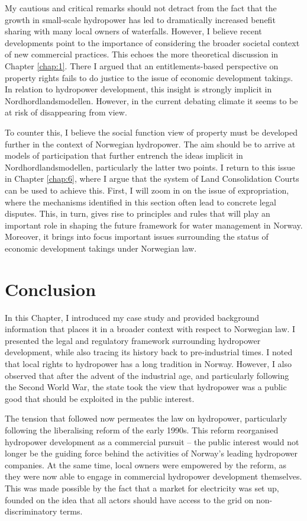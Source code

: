 My cautious and critical remarks should not detract from the fact that the growth in small-scale hydropower has led to dramatically increased benefit sharing with many local owners of waterfalls. However, I believe recent developments point to the importance of considering the broader societal context of new commercial practices. This echoes the more theoretical discussion in Chapter \ref{chap:1}. There I argued that an entitlements-based perspective on property rights fails to do justice to the issue of economic development takings. In relation to hydropower development, this insight is strongly implicit in Nordhordlandsmodellen. However, in the current debating climate it seems to be at risk of disappearing from view.

To counter this, I believe the social function view of property must be developed further in the context of Norwegian hydropower. The aim should be to arrive at models of participation that further entrench the ideas implicit in Nordhordlandsmodellen, particularly the latter two points. I return to this issue in Chapter \ref{chap:6}, where I argue that the system of Land Consolidation Courts can be used to achieve this. First, I will zoom in on the issue of expropriation, where the mechanisms identified in this section often lead to concrete legal disputes. This, in turn, gives rise to principles and rules that will play an important role in shaping the future framework for water management in Norway. Moreover, it brings into focus important issues surrounding the status of economic development takings under Norwegian law.

\section{Conclusion}\label{sec:conc3}

In this Chapter, I introduced my case study and provided background information that places it in a broader context with respect to Norwegian law. I presented the legal and regulatory framework surrounding hydropower development, while also tracing its history back to pre-industrial times. I noted that local rights to hydropower has a long tradition in Norway. However, I also observed that after the advent of the industrial age, and particularly following the Second World War, the state took the view that hydropower was a public good that should be exploited in the public interest.

The tension that followed now permeates the law on hydropower, particularly following the liberalising reform of the early 1990s. This reform reorganised hydropower development as a commercial pursuit -- the public interest would not longer be the guiding force behind the activities of Norway's leading hydropower companies. At the same time, local owners were empowered by the reform, as they were now able to engage in commercial hydropower development themselves. This was made possible by the fact that a market for electricity was set up, founded on the idea that all actors should have access to the grid on non-discriminatory terms. 

